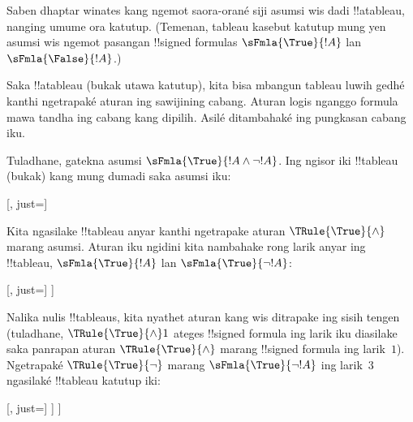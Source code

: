 \documentclass[../../../include/open-logic-section]{subfiles}
\begin{document}
\begin{ex}
  Saben dhaptar winates kang ngemot saora-orané siji asumsi wis dadi
  !!a{tableau}, nanging umume
  ora katutup. (Temenan, tableau kasebut katutup mung yen asumsi wis
  ngemot pasangan !!{signed formula}s $\sFmla{\True}{!A}$
  lan~$\sFmla{\False}{!A}$.)

  Saka !!a{tableau} (bukak utawa katutup), kita bisa mbangun tableau
  luwih gedhé kanthi ngetrapaké aturan ing sawijining cabang.
  Aturan logis nganggo formula mawa tandha ing cabang kang dipilih.
  Asilé ditambahaké ing pungkasan cabang iku.

  Tuladhane, gatekna asumsi $\sFmla{\True}{!A \land \lnot !A}$. Ing
  ngisor iki !!{tableau} (bukak) kang mung dumadi saka asumsi iku:
  \begin{center}
    \begin{tableau}{}
      [, just=\TAss]
    \end{tableau}{}
  \end{center}
  Kita ngasilake !!{tableau} anyar kanthi ngetrapake aturan
  $\TRule{\True}{\land}$ marang asumsi. Aturan iku ngidini kita
  nambahake rong larik anyar ing !!{tableau},
  $\sFmla{\True}{!A}$ lan $\sFmla{\True}{\lnot !A}$:
  \begin{center}
    \begin{tableau}{}
      [, just=\TAss
        [\sFmla{\True}{\formula{A}}, just={\TRule{\True}{\land}[1]},
          [\sFmla{\True}{\lnot \formula{A}}, just={\TRule{\True}{\land}[1]}
          ]
        ]
      ]
    \end{tableau}{}
  \end{center}
  Nalika nulis !!{tableau}s, kita nyathet aturan kang wis ditrapake
  ing sisih tengen (tuladhane, $\TRule{\True}{\land} 1$ ateges
  !!{signed formula} ing larik iku diasilake saka panrapan aturan
  $\TRule{\True}{\land}$ marang !!{signed formula} ing larik~$1$).
  Ngetrapaké $\TRule{\True}{\lnot}$ marang $\sFmla{\True}{\lnot !A}$ ing larik~$3$ ngasilaké !!{tableau} katutup iki:
  \begin{center}
    \begin{tableau}{}
      [, just=\TAss
        [\sFmla{\True}{\formula{A}}, just={\TRule{\True}{\land}[1]}
          [\sFmla{\True}{\lnot \formula{A}}, just={\TRule{\True}{\land}[1]}
            [\sFmla{\False}{\formula{A}}, just={\TRule{\True}{\lnot}[3]}, close]
          ]
        ]
      ]
    \end{tableau}{}
  \end{center}
\end{ex}
\end{document}
